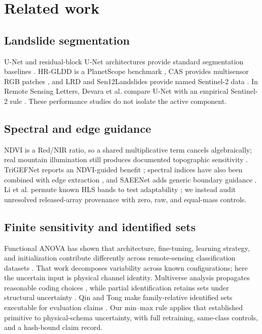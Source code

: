 \section{Related work}
\label{sec:related}

\subsection{Landslide segmentation}

U-Net and residual-block U-Net architectures provide standard segmentation baselines \citep{ronneberger2015unet,zhang2018resunet}. HR-GLDD is a PlanetScope benchmark \citep{meena2023hrgldd}, CAS provides multisensor RGB patches \citep{xu2024cas}, and LRD and Sen12Landslides provide named Sentinel-2 data \citep{orynbaikyzy2025lrd,hohn2025sen12}. In Remote Sensing Letters, Devara et al. compare U-Net with an empirical Sentinel-2 rule \citep{devara2024landslide}. These performance studies do not isolate the active component.

\subsection{Spectral and edge guidance}

NDVI is a Red/NIR ratio, so a shared multiplicative term cancels algebraically;
real mountain illumination still produces documented topographic sensitivity
\citep{matsushita2007sensitivity}. TriGEFNet reports an NDVI-guided benefit
\citep{trigefnet2026}; spectral indices have also been combined with edge
extraction \citep{zhang2023boosting}, and SAEENet adds generic boundary guidance
\citep{wang2025saeenet}. Li et al. permute known HLS bands to test adaptability
\citep{li2025bandadaptability}; we instead audit unresolved released-array
provenance with zero, raw, and equal-mass controls.

\subsection{Finite sensitivity and identified sets}

Functional ANOVA has shown that architecture, fine-tuning, learning strategy,
and initialization contribute differently across remote-sensing classification
datasets \citep{shiri2026fanova}. That work decomposes variability across known
configurations; here the uncertain input is physical channel identity.
Multiverse analysis propagates reasonable coding choices
\citep{steegen2016multiverse}, while partial identification retains sets under
structural uncertainty \citep{manski2021partial}. Qin and Tong make
family-relative identified sets executable for evaluation claims
\citep{qin2026evaluation}. Our min--max rule applies that established primitive
to physical-schema uncertainty, with full retraining, same-class controls, and
a hash-bound claim record.

